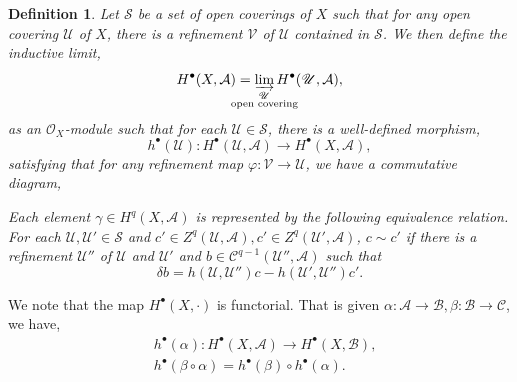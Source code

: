 \documentclass{article}
\newtheorem{definition}{Definition}[section]
\newcommand{\cA}[0]{\mathcal{A}}
\newcommand{\cB}[0]{\mathcal{B}}
\newcommand{\cC}[0]{\mathcal{C}}
\newcommand{\sU}[0]{\mathscr{U}}
\newcommand{\sV}[0]{\mathscr{V}}
\newcommand{\Ouv}[0]{\mathcal{O}}
\begin{document}
\begin{definition}
  Let $\mathscr{S}$ be a set of open coverings of $X$ such that for any open covering $\sU$ of $X$, there is a refinement $\sV$ of $\sU$ contained in $\mathscr{S}$. We then define the inductive limit,
  \begin{equation*}
    H^\bullet(X,\mathcal{A}) = \varinjlim_{\substack{\sU\\\text{\makebox[0pt][c]{open covering}}}}H^\bullet(\sU,\cA),
  \end{equation*}
  as an $\Ouv_X$-module such that for each $\sU\in\mathscr{S}$, there is a well-defined morphism,
  \begin{equation*}
    h^\bullet(\sU):H^\bullet(\sU,\cA)\to H^\bullet(X,\mathcal{A}),
  \end{equation*}
  satisfying that for any refinement map $\varphi:\sV\to\sU$, we have a commutative diagram,
  \begin{center}
  \end{center}
  Each element $\gamma\in H^q(X,\cA)$ is represented by the following equivalence relation. For each $\sU,\sU'\in\mathscr{S}$ and $c'\in Z^q(\sU,\cA),c'\in Z^q(\sU',\cA)$, $c\sim c'$ if there is a refinement $\sU''$ of $\sU$ and $\sU'$ and $b\in \cC^{q-1}(\sU'',\cA)$ such that 
  \begin{equation*}
    \delta b = h(\sU,\sU'')c-h(\sU',\sU'')c'.
  \end{equation*}
\end{definition}

We note that the map $H^\bullet(X,\cdot)$ is functorial. That is given $\alpha:\cA\to\cB, \beta:\cB\to\cC$, we have,
\begin{align*}
  &h^\bullet(\alpha):H^\bullet(X,\cA)\to H^\bullet(X,\cB),\\
  &h^\bullet(\beta\circ\alpha) = h^\bullet(\beta)\circ h^\bullet(\alpha).
\end{align*}
\end{document}
